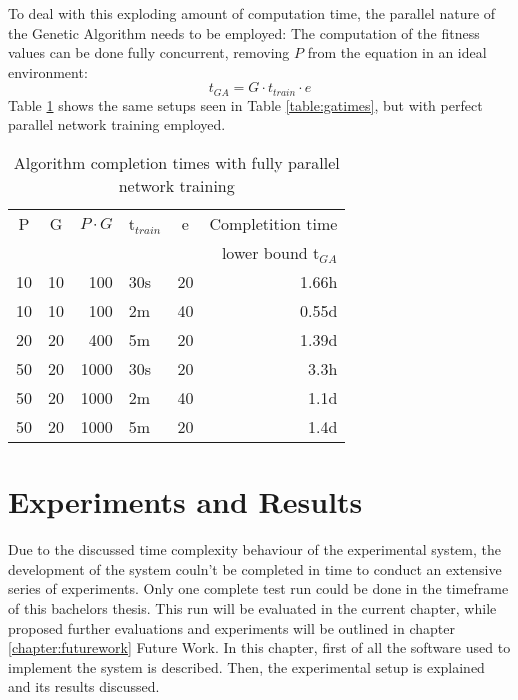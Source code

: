 \documentclass[11pt,a4paper,twoside,openright]{scrbook}
\begin{document}
To deal with this exploding amount of computation time, the parallel nature of the Genetic Algorithm needs to be employed: The computation of the fitness values can be done fully concurrent, removing \(P\) from the equation in an ideal environment:
\begin{equation}
  t_{GA} = G \cdot t_{train} \cdot e
\end{equation}
Table \ref{table:parallel} shows the same setups seen in Table \ref{table:gatimes}, but with perfect parallel network training employed.

\begin{table}[h]
  \begin{center}
  \begin{tabular}{| c | c | r | l | c || r |}
    \hline
    P & G & \(P \cdot G\) & t\(_{train}\) & e & Completition time\\
    & & & & & lower bound t\(_{GA}\) \\
    \hline
    10 & 10 & 100 & 30s & 20 & 1.66h \\
    10 & 10 & 100 & 2m & 40 & 0.55d \\
    20 & 20 & 400 & 5m & 20 & 1.39d \\
    50 & 20 & 1000 & 30s & 20 & 3.3h \\
    50 & 20 & 1000 & 2m & 40 & 1.1d \\
    50 & 20 & 1000 & 5m & 20 & 1.4d \\
    \hline

  \end{tabular}
\end{center}
\caption{Algorithm completion times with fully parallel network training}
\label{table:parallel}
\end{table}


\chapter{Experiments and Results}

Due to the discussed time complexity behaviour of the experimental system, the development of the system couln't be completed in time to conduct an extensive series of experiments. Only one complete test run could be done in the timeframe of this bachelors thesis. This run will be evaluated in the current chapter, while proposed further evaluations and experiments will be outlined in chapter \ref{chapter:futurework} Future Work.
In this chapter, first of all the software used to implement the system is described. Then, the experimental setup is explained and its results discussed.
\end{document}
